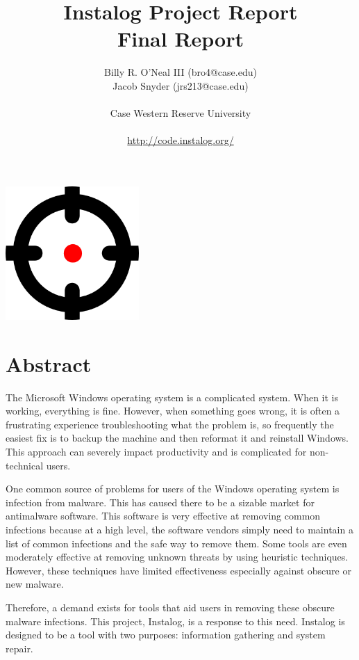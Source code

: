 \documentclass[letterpaper,12pt]{article}
\title{Instalog Project Report \\
Final Report}
\author{
Billy R. O'Neal III (bro4@case.edu) \\
Jacob Snyder (jrs213@case.edu) \\ \\
Case Western Reserve University \\ \\ 
\url{http://code.instalog.org/}
}
\begin{document}
\maketitle
\vspace{1in}
\begin{center}
\includegraphics[width=2in, height=2in]{figures/InstalogLogo.png}
\end{center}
\newpage



\tableofcontents
\newpage



\section{Abstract} \label{abstract}
The Microsoft Windows operating system is a complicated system.  When it is
working, everything is fine.  However, when something goes wrong, it is often a
frustrating experience troubleshooting what the problem is, so frequently the
easiest fix is to backup the machine and then reformat it and reinstall Windows.
This approach can severely impact productivity and is complicated for
non-technical users.  

One common source of problems for users of the Windows operating system is
infection from malware.  This has caused there to be a sizable market for
antimalware software.  This software is very effective at removing common
infections because at a high level, the software vendors simply need to maintain
a list of common infections and the safe way to remove them.  Some tools are
even moderately effective at removing unknown threats by using heuristic
techniques.  However, these techniques have limited effectiveness especially
against obscure or new malware.  

Therefore, a demand exists for tools that aid users in removing these obscure
malware infections.  This project, Instalog, is a response to this need. 
Instalog is designed to be a tool with two purposes: information gathering and
system repair.
\end{document}
